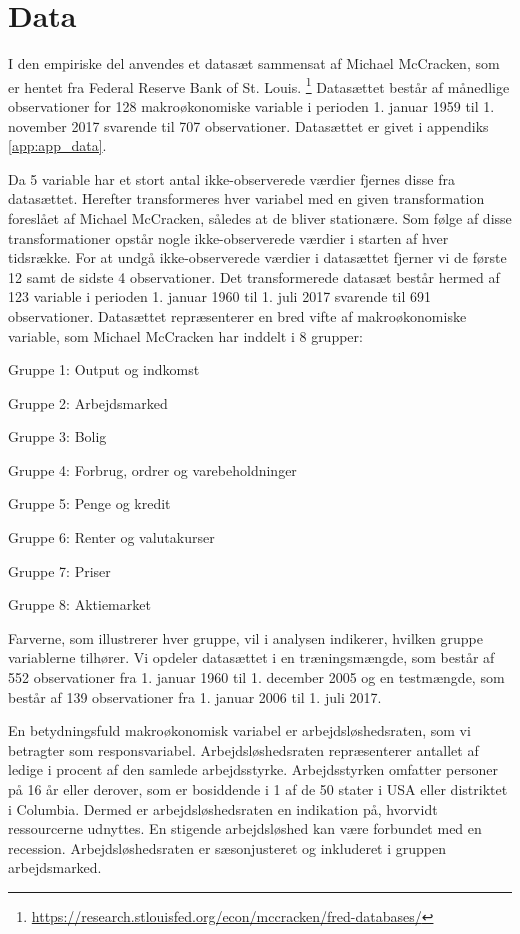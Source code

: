 \chapter{Data} \label{ch:data}
I den empiriske del anvendes et datasæt sammensat af Michael McCracken, som er hentet fra Federal Reserve Bank of St. Louis. \footnote{\url{https://research.stlouisfed.org/econ/mccracken/fred-databases/}}
Datasættet består af månedlige observationer for 128 makroøkonomiske variable i perioden 1. januar 1959 til 1. november 2017 svarende til 707 observationer.
Datasættet er givet i appendiks \ref{app:app_data}.

Da 5 variable har et stort antal ikke-observerede værdier fjernes disse fra datasættet.
Herefter transformeres hver variabel med en given transformation foreslået af Michael McCracken, således at de bliver stationære.
Som følge af disse transformationer opstår nogle ikke-observerede værdier i starten af hver tidsrække.
For at undgå ikke-observerede værdier i datasættet fjerner vi de første 12 samt de sidste 4 observationer.
Det transformerede datasæt består hermed af 123 variable i perioden 1. januar 1960 til 1. juli 2017 svarende til 691 observationer.
Datasættet repræsenterer en bred vifte af makroøkonomiske variable, som Michael McCracken har inddelt i 8 grupper:
%
\begin{description}
\item Gruppe 1: Output og indkomst 
\item Gruppe 2: Arbejdsmarked 
\item Gruppe 3: Bolig 
\item Gruppe 4: Forbrug, ordrer og varebeholdninger  
\item Gruppe 5: Penge og kredit 
\item Gruppe 6: Renter og valutakurser 
\item Gruppe 7: Priser 
\item Gruppe 8: Aktiemarket 
\end{description} 
%
Farverne, som illustrerer hver gruppe, vil i analysen indikerer, hvilken gruppe variablerne tilhører.
Vi opdeler datasættet i en træningsmængde, som består af 552 observationer fra 1. januar 1960 til 1. december 2005 og en testmængde, som består af 139 observationer fra 1. januar 2006 til 1. juli 2017. 

En betydningsfuld makroøkonomisk variabel er arbejdsløshedsraten, som vi betragter som responsvariabel. 
Arbejdsløshedsraten repræsenterer antallet af ledige i procent af den samlede arbejdsstyrke.
Arbejdsstyrken omfatter personer på 16 år eller derover, som er bosiddende i 1 af de 50 stater i USA eller distriktet i Columbia.
Dermed er arbejdsløshedsraten en indikation på, hvorvidt ressourcerne udnyttes.
En stigende arbejdsløshed kan være forbundet med en recession.
Arbejdsløshedsraten er sæsonjusteret og inkluderet i gruppen arbejdsmarked.

